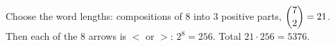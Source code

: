 Choose the word lengths: compositions of $8$ into $3$ positive parts, $\dbinom72=21$. Then each of the $8$ arrows is $<$ or $>$: $2^8=256$. Total $21\cdot256=\boxed{5376}$.
